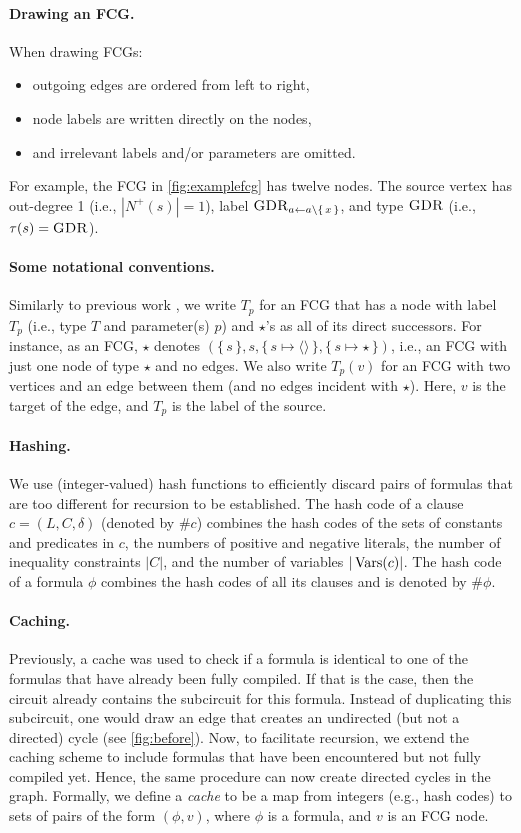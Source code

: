 \paragraph{Drawing an FCG.}
When drawing FCGs:
\begin{itemize}
  \item outgoing edges are ordered from left to right,
  \item node labels are written directly on the nodes,
  \item and irrelevant labels and/or parameters are omitted.
\end{itemize}
For example, the FCG in \cref{fig:examplefcg} has twelve nodes. The source
vertex has out-degree 1 (i.e., $|N^+(s)| = 1$), label
$\operatorname{\textsc{GDR}}_{a \gets a \setminus \{\, x \,\}}$, and type $\operatorname{\textsc{GDR}}$ (i.e.,
$\tau(s) = \operatorname{\textsc{GDR}}$).

\paragraph{Some notational conventions.}
Similarly to previous work \citep{DBLP:conf/ijcai/BroeckTMDR11}, we write $T_p$
for an FCG that has a node with label $T_p$ (i.e., type $T$ and parameter(s)
$p$) and $\star$'s as all of its direct successors. For instance, as an FCG,
$\star$ denotes
$(\{\, s \,\}, s, \{\, s \mapsto \langle\rangle \,\}, \{\, s \mapsto \star \,\})$,
i.e., an FCG with just one node of type $\star$ and no edges. We also write
$T_p(v)$ for an FCG with two vertices and an edge between them (and no edges
incident with $\star$). Here, $v$ is the target of the edge, and $T_p$ is the
label of the source.

\paragraph{Hashing.}
We use (integer-valued) hash functions to efficiently discard pairs of formulas
that are too different for recursion to be established. The hash code of a
clause $c = (L, C, \delta)$ (denoted by $\# c$) combines the hash codes of the
sets of constants and predicates in $c$, the numbers of positive and negative
literals, the number of inequality constraints $|C|$, and the number of
variables $|\operatorname{Vars}(c)|$. The hash code of a formula $\phi$ combines the hash
codes of all its clauses and is denoted by $\#\phi$.

\paragraph{Caching.}
Previously, a cache was used to check if a formula is identical to one of the
formulas that have already been fully compiled. If that is the case, then the
circuit already contains the subcircuit for this formula. Instead of duplicating
this subcircuit, one would draw an edge that creates an undirected (but not a
directed) cycle (see \cref{fig:before}). Now, to facilitate recursion, we extend
the caching scheme to include formulas that have been encountered but not fully
compiled yet. Hence, the same procedure can now create directed cycles in the
graph. Formally, we define a \emph{cache} to be a map from integers (e.g., hash
codes) to sets of pairs of the form $(\phi, v)$, where $\phi$ is a formula, and
$v$ is an FCG node.

